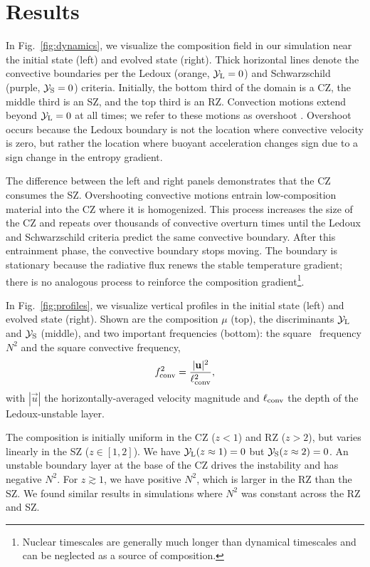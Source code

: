 \section{Results}
\label{sec:results}

In Fig.~\ref{fig:dynamics}, we visualize the composition field in our simulation near the initial state (left) and evolved state (right).
Thick horizontal lines denote the convective boundaries per the Ledoux (orange, $\mathcal{Y}_{\rm{L}} = 0$) and Schwarzschild (purple, $\mathcal{Y}_{\rm{S}}=0$) criteria.
Initially, the bottom third of the domain is a CZ, the middle third is an SZ, and the top third is an RZ.
Convection motions extend beyond $\mathcal{Y}_{\rm{L}} = 0$ at all times; we refer to these motions as overshoot \citep[which is discussed in][]{korre_etal_2019}.
Overshoot occurs because the Ledoux boundary is not the location where convective velocity is zero, but rather the location where buoyant acceleration changes sign due to a sign change in the entropy gradient.

The difference between the left and right panels demonstrates that the CZ consumes the SZ.
Overshooting convective motions entrain low-composition material into the CZ where it is homogenized.
This process increases the size of the CZ and repeats over thousands of convective overturn times until the Ledoux and Schwarzschild criteria predict the same convective boundary.
After this entrainment phase, the convective boundary stops moving.
The boundary is stationary because the radiative flux renews the stable temperature gradient; there is no analogous process to reinforce the composition gradient\footnote{Nuclear timescales are generally much longer than dynamical timescales and can be neglected as a source of composition.}.

In Fig.~\ref{fig:profiles}, we visualize vertical profiles in the initial state (left) and evolved state (right).
Shown are the composition $\mu$ (top), the discriminants $\mathcal{Y}_{\rm{L}}$ and $\mathcal{Y}_{\rm{S}}$ (middle), and two important frequencies (bottom): the square \brunt$\,$ frequency $N^2$ and the square convective frequency,
\begin{equation}
f_{\rm{conv}}^2 = \frac{|\vec{u}|^2}{\ell_{\rm{conv}}^2},
\label{eqn:fconv2}
\end{equation}
with $|\vec{u}|$ the horizontally-averaged velocity magnitude and $\ell_{\rm{conv}}$ the depth of the Ledoux-unstable layer.

The composition is initially uniform in the CZ ($z < 1$) and RZ ($z > 2$), but varies linearly in the SZ ($z \in [1, 2]$).
We have $\mathcal{Y}_{\rm{L}}(z\approx1) = 0$ but $\mathcal{Y}_{\rm{S}}(z\approx2) = 0$.
An unstable boundary layer at the base of the CZ drives the instability and has negative $N^2$.
For $z \gtrsim 1$, we have positive $N^2$, which is larger in the RZ than the SZ.
We found similar results in simulations where $N^2$ was constant across the RZ and SZ.

